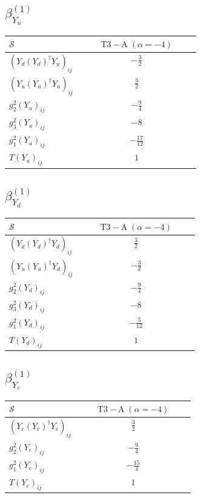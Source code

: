 \documentclass[9pt]{article}
\begin{document}
\subsection*{$ \beta_{Y_u}^{(1)} $}
\begin{longtable}{@{}p{0.38\linewidth}c@{}}
\toprule
$\mathcal{S}$ & $ \mathrm{T3-A}\;(\alpha=-4) $ \\
\midrule
$ (Y_d (Y_d)^{\dagger} Y_u)_{ij} $ & $ - \frac{3}{2} $ \\
$ (Y_u (Y_u)^{\dagger} Y_u)_{ij} $ & $ \frac{3}{2} $ \\
$ g_2^2 (Y_u)_{ij} $ & $ - \frac{9}{4} $ \\
$ g_3^2 (Y_u)_{ij} $ & $ -8 $ \\
$ g_1^2 (Y_u)_{ij} $ & $ - \frac{17}{12} $ \\
$ T (Y_u)_{ij} $ & $ 1 $ \\
\bottomrule
\end{longtable}
\subsection*{$ \beta_{Y_d}^{(1)} $}
\begin{longtable}{@{}p{0.38\linewidth}c@{}}
\toprule
$\mathcal{S}$ & $ \mathrm{T3-A}\;(\alpha=-4) $ \\
\midrule
$ (Y_d (Y_d)^{\dagger} Y_d)_{ij} $ & $ \frac{3}{2} $ \\
$ (Y_u (Y_u)^{\dagger} Y_d)_{ij} $ & $ - \frac{3}{2} $ \\
$ g_2^2 (Y_d)_{ij} $ & $ - \frac{9}{4} $ \\
$ g_3^2 (Y_d)_{ij} $ & $ -8 $ \\
$ g_1^2 (Y_d)_{ij} $ & $ - \frac{5}{12} $ \\
$ T (Y_d)_{ij} $ & $ 1 $ \\
\bottomrule
\end{longtable}
\subsection*{$ \beta_{Y_e}^{(1)} $}
\begin{longtable}{@{}p{0.38\linewidth}c@{}}
\toprule
$\mathcal{S}$ & $ \mathrm{T3-A}\;(\alpha=-4) $ \\
\midrule
$ (Y_e (Y_e)^{\dagger} Y_e)_{ij} $ & $ \frac{3}{2} $ \\
$ g_2^2 (Y_e)_{ij} $ & $ - \frac{9}{4} $ \\
$ g_1^2 (Y_e)_{ij} $ & $ - \frac{15}{4} $ \\
$ T (Y_e)_{ij} $ & $ 1 $ \\
\bottomrule
\end{longtable}
\end{document}
